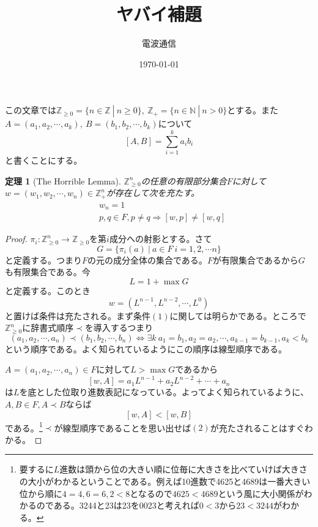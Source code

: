 \documentclass[leqno]{jsarticle}
\title{ヤバイ補題}
\author{電波通信}
\date{\today}
\newtheorem{thm}{定理}
\newcommand{\To}{\Longrightarrow}
\newcommand{\nn}{\mathbb{N}}
\newcommand{\zz}{\mathbb{Z}}
\newcommand{\zo}{\zz_{\ge 0}}
\newcommand{\zp}{\zz_{+}}
\begin{document}
\maketitle
この文章では$\zz_{\ge 0}=\{n\in\zz\ |\ n\ge 0\},\ \zz_{+}=\{n\in \nn \ |\ n>0\}$とする。また
$A=(a_1,a_2,\cdots ,a_k),\ B=(b_1,b_2,\cdots ,b_k)$について
\[
[A,B]=\sum_{i=1}^ka_ib_i
\]
と書くことにする。
\begin{thm}[The Horrible Lemma]
$\zo^n$の任意の有限部分集合$F$に対して$w=(w_1,w_2,\cdots ,w_n)\in \zp^n$が存在して次を充たす。
\begin{align}
&w_n=1\\
&p,q\in F,p\neq q\To [w,p]\neq[w,q]
\end{align}
\end{thm}
\begin{proof}
$\pi_i:\zo^n\to\zo$を第$i$成分への射影とする。さて
\[
G=\{\pi_i(a)\ |\ a\in F\ i=1,2,\cdots n\}
\]
と定義する。つまり$F$の元の成分全体の集合である。$F$が有限集合であるから$G$も有限集合である。今
\[
L=1+\max G
\]
と定義する。このとき
\[
w=(L^{n-1},L^{n-2},\cdots ,L^0)
\]
と置けば条件は充たされる。まず条件$(1)$に関しては明らかである。ところで$\zo^n$に辞書式順序$\prec$を導入するつまり
\[
(a_1,a_2,\cdots ,a_n)\prec (b_1,b_2,\cdots ,b_n)\iff \exists k\ a_1=b_1,a_2=a_2,\cdots,a_{k-1}=b_{k-1},a_{k}<b_{k}
\]
という順序である。よく知られているようにこの順序は線型順序である。\par
$A=(a_1,a_2,\cdots ,a_n)\in F$に対して$L>\max G$であるから
\[
[w,A]=a_1L^{n-1}+a_2L^{n-2}+\cdots +a_n
\]
は$L$を底とした位取り進数表記になっている。よってよく知られているように、$A,B\in F,A\prec B$ならば
\[
[w,A]<[w,B]
\]
である。\footnote{要するに$L$進数は頭から位の大きい順に位毎に大きさを比べていけば大きさの大小がわかるということである。例えば10進数で4625と4689は一番大きい位から順に$4=4,6=6,2<8$となるので$4625<4689$という風に大小関係がわかるのである。3244と23は23を0023と考えれば$0<3$から$23<3244$がわかる。}$\prec$が線型順序であることを思い出せば$(2)$が充たされることはすぐわかる。
\end{proof}
























			
\end{document}
